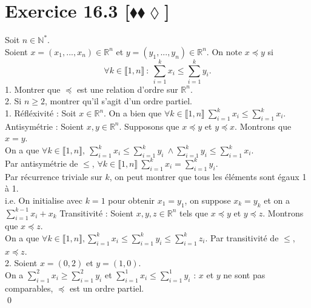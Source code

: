 \documentclass[10pt]{article}
\begin{document}
\section*{Exercice 16.3 [$\blacklozenge\blacklozenge\lozenge$]}
\begin{tcolorbox}[enhanced, width=7.6in, center, size=fbox, fontupper=\large, drop shadow southwest]
    Soit $n\in\mathbb{N}^*$.\\
    Soient $x=(x_1,...,x_n)\in\mathbb{R}^n$ et $y=(y_1,...,y_n)\in\mathbb{R}^n$. On note $x \preceq y$ si
    \begin{equation*}
        \forall k \in \llbracket 1, n \rrbracket ~ : ~ \sum_{i=1}^kx_i \leq \sum_{i=1}^ky_i.
    \end{equation*}
    1. Montrer que $\preceq$ est une relation d'ordre sur $\mathbb{R}^n$.\\
    2. Si $n \geq 2$, montrer qu'il s'agit d'un ordre partiel.\\[0.2cm]
    1. Réfléxivité : Soit $x\in\mathbb{R}^n$. On a bien que $\forall k \in \llbracket 1,n \rrbracket ~\sum_{i=1}^kx_i \leq \sum_{i=1}^kx_i$.\\[0.1cm]
    Antisymétrie : Soient $x,y\in\mathbb{R}^n$. Supposons que $x \preceq y$ et $y \preceq x$. Montrons que $x=y$.\\
    On a que $\forall k \in \llbracket 1, n \rrbracket, ~ \sum_{i=1}^kx_i \leq \sum_{i=1}^ky_i ~ \wedge \sum_{i=1}^ky_i \leq \sum_{i=1}^kx_i$.\\
    Par antisymétrie de $\leq$, $\forall k \in \llbracket 1, n \rrbracket ~ \sum_{i=1}^kx_i = \sum_{i=1}^k y_i$.\\
    Par récurrence triviale sur $k$, on peut montrer que tous les éléments sont égaux 1 à 1.\\
    i.e. On initialise avec $k=1$ pour obtenir $x_1=y_1$, on suppose $x_k = y_k$ et on a $\sum_{i=1}^{k-1}x_i + x_k  $
    Transitivité : Soient $x,y,z \in \mathbb{R}^n$ tels que $x \preceq y$ et $y \preceq z$. Montrons que $x \preceq z$.\\
    On a que $\forall k \in \llbracket 1, n \rrbracket, \sum_{i=1}^kx_i \leq \sum_{i=1}^ky_i\leq\sum_{i=1}^kz_i$. Par transitivité de $\leq$, $x \preceq z$.\\[0.2cm]
    2. Soient $x=(0,2)$ et $y=(1,0)$.\\
    On a $\sum_{i=1}^2x_i \geq \sum_{i=1}^2y_i$ et $\sum_{i=1}^1x_i \leq \sum_{i=1}^1y_i$ : $x$ et $y$ ne sont pas comparables, $\preceq$ est un ordre partiel.\\
    \qed
\end{tcolorbox}
\end{document}

